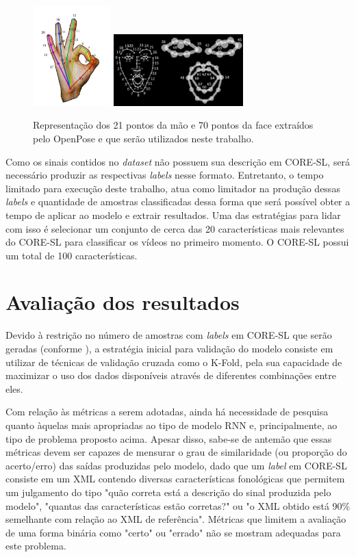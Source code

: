 \begin{figure}[ht]
    \centering
    \includegraphics[width=3cm]{images/keypoints_hand}
    \includegraphics[width=5cm]{images/keypoints_face}
    \caption{Representação dos 21 pontos da mão e 70 pontos da face extraídos pelo OpenPose e que serão utilizados neste trabalho.}
    \label{fig:keypoints-face-hand}
\end{figure}
Como os sinais contidos no \textit{dataset} não possuem sua descrição em CORE-SL, será necessário produzir as respectivas \textit{labels} nesse formato. Entretanto, o tempo limitado para execução deste trabalho, atua como limitador na produção dessas \textit{labels} e quantidade de amostras classificadas dessa forma que será possível obter a tempo de aplicar ao modelo e extrair resultados. Uma das estratégias para lidar com isso é selecionar um conjunto de cerca das 20 características mais relevantes do CORE-SL para classificar os vídeos no primeiro momento. O CORE-SL possui um total de 100 características.


\section{Avaliação dos resultados}
Devido à restrição no número de amostras com \textit{labels} em CORE-SL que serão geradas (conforme ), a estratégia inicial para validação do modelo consiste em utilizar de técnicas de validação cruzada como o K-Fold, pela sua capacidade de maximizar o uso dos dados disponíveis através de diferentes combinações entre eles.

Com relação às métricas a serem adotadas, ainda há necessidade de pesquisa quanto àquelas mais apropriadas ao tipo de modelo RNN e, principalmente, ao tipo de problema proposto acima. Apesar disso, sabe-se de antemão que essas métricas devem ser capazes de mensurar o grau de similaridade (ou proporção do acerto/erro) das saídas produzidas pelo modelo, dado que um \textit{label} em CORE-SL consiste em um XML contendo diversas características fonológicas que permitem um julgamento do tipo "quão correta está a descrição do sinal produzida pelo modelo", "quantas das características estão corretas?" ou "o XML obtido está 90\% semelhante com relação ao XML de referência". Métricas que limitem a avaliação de uma forma binária como "certo" ou "errado" não se mostram adequadas para este problema.






